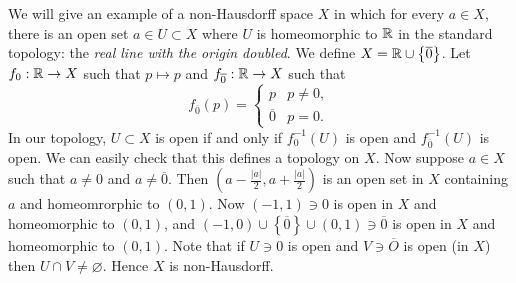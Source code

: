 \begin{example}[]
	We will give an example of a non-Hausdorff space $X$ in which for every
	$a \in X$, there is an open set $a \in U \subset X$ where $U$ is 
	homeomorphic to $\mathbb{R}$ in the standard topology: the \emph{real line with the
	origin doubled}.
	We define $X = \mathbb{R} \cup \left\{ \overline 0 \right\}$.
	Let $f_0 : \mathbb{R} \to X$ such that $p \mapsto p$ and $f_{\overline 0}: \mathbb{R} \to X$
	such that
	\[
		f_{\overline 0}(p) =
		\begin{cases}
			p           & p \neq 0, \\
			\overline 0 & p = 0.
		\end{cases}
	\]
	In our topology, $U \subset X$ is open if and only if $f_{0}^{-1}(U)$ is
	open and $f_{\overline 0}^{-1}(U)$ is open.
	We can easily check that this defines a topology on $X$.
	Now suppose $a \in X$ such that $a \neq 0$ and $a \neq \overline 0$.
	Then 
	$
		\left( 
			a - \frac{\left\lvert a \right\rvert}{2}, 
			a + \frac{\left\lvert a \right\rvert}{2} 
		\right)
	$ 
	is an open set in $X$ containing $a$ and homeomrorphic to $(0,1)$.
	Now $(-1, 1) \ni 0$ is open in $X$ and homeomorphic to $(0,1)$,
	and $(-1, 0) \cup \left\{ \overline 0 \right\} \cup (0,1) \ni \overline 0$
	is open in $X$ and homeomorphic to $(0,1)$.
	Note that if $U \ni 0$ is open and $V \ni \overline O$ is open (in $X$)
	then $U \cap V \neq \varnothing$.
	Hence $X$ is non-Hausdorff.
\end{example}

